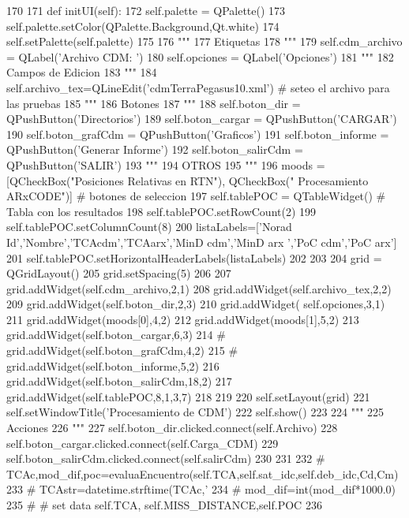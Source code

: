 \begin{DoxyCode}
170 
171     def initUI(self):
172         self.palette = QPalette()
173         self.palette.setColor(QPalette.Background,Qt.white)
174         self.setPalette(self.palette)
175         
176         """
177         Etiquetas
178         """
179         self.cdm_archivo = QLabel('Archivo CDM: ')   
180         self.opciones   = QLabel('Opciones')
181         """
182         Campos de Edicion
183         """   
184         self.archivo_tex=QLineEdit('cdmTerraPegasus10.xml') # seteo el archivo
       para las pruebas
185         """
186         Botones
187         """
188         self.boton_dir      = QPushButton('Directorios')
189         self.boton_cargar   = QPushButton('CARGAR')
190         self.boton_grafCdm  = QPushButton('Graficos')
191         self.boton_informe  = QPushButton('Generar Informe')
192         self.boton_salirCdm = QPushButton('SALIR')
193         """
194         OTROS
195         """                
196         moods = [QCheckBox("Posiciones Relativas en RTN"), QCheckBox("
      Procesamiento ARxCODE")] # botones de seleccion
197         self.tablePOC   = QTableWidget() # Tabla con los resultados
198         self.tablePOC.setRowCount(2)
199         self.tablePOC.setColumnCount(8)
200         listaLabels=['Norad Id','Nombre','TCAcdm','TCAarx','MinD cdm','MinD arx
      ','PoC cdm','PoC arx']
201         self.tablePOC.setHorizontalHeaderLabels(listaLabels)
202 
203         
204         grid = QGridLayout()
205         grid.setSpacing(5)
206         
207         grid.addWidget(self.cdm_archivo,2,1)
208         grid.addWidget(self.archivo_tex,2,2)
209         grid.addWidget(self.boton_dir,2,3)
210         grid.addWidget( self.opciones,3,1)
211         grid.addWidget(moods[0],4,2)     
212         grid.addWidget(moods[1],5,2)
213         grid.addWidget(self.boton_cargar,6,3)
214 #         grid.addWidget(self.boton_grafCdm,4,2)
215 #         grid.addWidget(self.boton_informe,5,2)
216         grid.addWidget(self.boton_salirCdm,18,2)
217         grid.addWidget(self.tablePOC,8,1,3,7)
218 
219         
220         self.setLayout(grid)
221         self.setWindowTitle('Procesamiento de CDM')    
222         self.show()
223         
224         """
225         Acciones
226         """
227         self.boton_dir.clicked.connect(self.Archivo)
228         self.boton_cargar.clicked.connect(self.Carga_CDM)
229         self.boton_salirCdm.clicked.connect(self.salirCdm)
230         
231 
232 #        
       TCAc,mod_dif,poc=evaluaEncuentro(self.TCA,self.sat_idc,self.deb_idc,Cd,Cm)
233 #         TCAstr=datetime.strftime(TCAc,'%
234 #         mod_dif=int(mod_dif*1000.0)
235 #         # set data self.TCA, self.MISS_DISTANCE,self.POC
236 

\end{DoxyCode}


